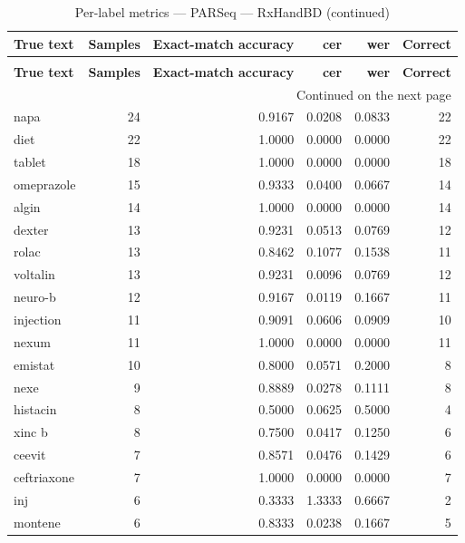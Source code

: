 \begingroup
\setlength{\tabcolsep}{2.5pt}
\renewcommand{\arraystretch}{1.05}
\sloppy
\scriptsize
\begin{longtable}{p{3.0cm}rrrrr}
\caption{Per-label metrics — PARSeq — RxHandBD}\label{tab:e4-02_parseq_evaluation-per-label}\\
\toprule
\textbf{True text} & \textbf{Samples} & \textbf{Exact-match accuracy} & \textbf{cer} & \textbf{wer} & \textbf{Correct} \\
\midrule
\endfirsthead
\caption*{Per-label metrics — PARSeq — RxHandBD (continued)}\\
\toprule
\textbf{True text} & \textbf{Samples} & \textbf{Exact-match accuracy} & \textbf{cer} & \textbf{wer} & \textbf{Correct} \\
\midrule
\endhead
\midrule
\multicolumn{6}{r}{Continued on the next page}\\
\endfoot
\bottomrule
\endlastfoot
napa & 24 & 0.9167 & 0.0208 & 0.0833 & 22 \\
diet & 22 & 1.0000 & 0.0000 & 0.0000 & 22 \\
tablet & 18 & 1.0000 & 0.0000 & 0.0000 & 18 \\
omeprazole & 15 & 0.9333 & 0.0400 & 0.0667 & 14 \\
algin & 14 & 1.0000 & 0.0000 & 0.0000 & 14 \\
dexter & 13 & 0.9231 & 0.0513 & 0.0769 & 12 \\
rolac & 13 & 0.8462 & 0.1077 & 0.1538 & 11 \\
voltalin & 13 & 0.9231 & 0.0096 & 0.0769 & 12 \\
neuro-b & 12 & 0.9167 & 0.0119 & 0.1667 & 11 \\
injection & 11 & 0.9091 & 0.0606 & 0.0909 & 10 \\
nexum & 11 & 1.0000 & 0.0000 & 0.0000 & 11 \\
emistat & 10 & 0.8000 & 0.0571 & 0.2000 & 8 \\
nexe & 9 & 0.8889 & 0.0278 & 0.1111 & 8 \\
histacin & 8 & 0.5000 & 0.0625 & 0.5000 & 4 \\
xinc b & 8 & 0.7500 & 0.0417 & 0.1250 & 6 \\
ceevit & 7 & 0.8571 & 0.0476 & 0.1429 & 6 \\
ceftriaxone & 7 & 1.0000 & 0.0000 & 0.0000 & 7 \\
inj & 6 & 0.3333 & 1.3333 & 0.6667 & 2 \\
montene & 6 & 0.8333 & 0.0238 & 0.1667 & 5 \\

\end{longtable}
